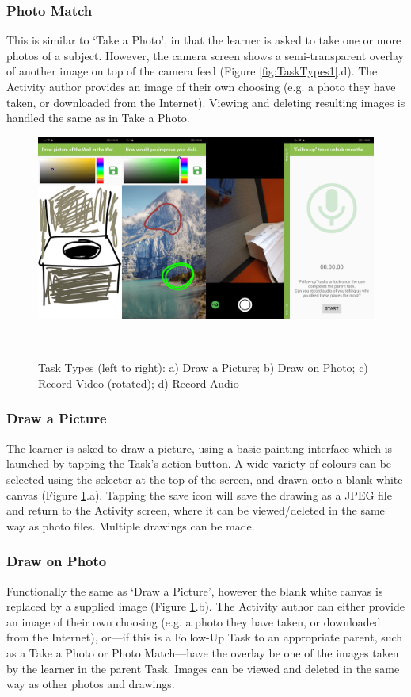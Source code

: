 \subsubsection*{Photo Match}
This is similar to `Take a Photo', in that the learner is asked to take one or more photos of a subject. However, the camera screen shows a semi-transparent overlay of another image on top of the camera feed (Figure \ref{fig:TaskTypes1}.d). The Activity author provides an image of their own choosing (e.g. a photo they have taken, or downloaded from the Internet). Viewing and deleting resulting images is handled the same as in Take a Photo.

\begin{figure}
  \centering
  \includegraphics[width=1\columnwidth]{images/chapter05/tasktypes2.png}
  \caption{Task Types (left to right): a) Draw a Picture; b) Draw on Photo; c) Record Video (rotated); d) Record Audio}~\label{fig:TaskTypes2}
\end{figure}

\subsubsection*{Draw a Picture}
The learner is asked to draw a picture, using a basic painting interface which is launched by tapping the Task's action button. A wide variety of colours can be selected using the selector at the top of the screen, and drawn onto a blank white canvas (Figure \ref{fig:TaskTypes2}.a). Tapping the save icon will save the drawing as a JPEG file and return to the Activity screen, where it can be viewed/deleted in the same way as photo files. Multiple drawings can be made.

\subsubsection*{Draw on Photo}
Functionally the same as `Draw a Picture', however the blank white canvas is replaced by a supplied image (Figure \ref{fig:TaskTypes2}.b). The Activity author can either provide an image of their own choosing (e.g. a photo they have taken, or downloaded from the Internet), or---if this is a Follow-Up Task to an appropriate parent, such as a Take a Photo or Photo Match---have the overlay be one of the images taken by the learner in the parent Task. Images can be viewed and deleted in the same way as other photos and drawings.

